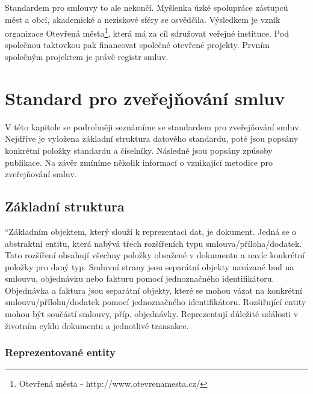 Standardem pro smlouvy to ale nekončí. Myšlenka úzké spolupráce zástupců měst a obcí, akademické a neziskové sféry se osvědčila. Výsledkem je vznik organizace Otevřená města\footnote{Otevřená města - http://www.otevrenamesta.cz/}, která má za cíl sdružovat veřejné instituce. Pod společnou taktovkou pak financovat společné otevřené projekty. Prvním společným projektem je právě registr smluv.

\section{Standard pro zveřejňování smluv}

V této kapitole se podrobněji seznámíme se standardem pro zveřejňování smluv. Nejdříve je vyložena základní struktura datového standardu, poté jsou popsány konkrétní položky standardu a číselníky. Následně jsou popsány způsoby publikace. Na závěr zmíníme několik informací o vznikající metodice pro zveřejňování smluv. 

\subsection{Základní struktura}

“Základním objektem, který slouží k reprezentaci dat, je dokument. Jedná se o abstraktní entitu, která nabývá třech rozšířeních typu smlouva/příloha/dodatek. Tato rozšíření obsahují všechny položky obsažené v dokumentu a navíc konkrétní položky pro daný typ.
Smluvní strany jsou separátní objekty navázané buď na smlouvu, objednávku nebo fakturu pomocí jednoznačného identifikátoru.
Objednávka a faktura jsou separátní objekty, které se mohou vázat na konkrétní smlouvu/přílohu/dodatek pomocí jednoznačného identifikátoru.
Rozšiřující entity mohou být součástí smlouvy, příp. objednávky. Reprezentují důležité události v životním cyklu dokumentu a jednotlivé transakce. 

\subsubsection*{Reprezentované entity}

